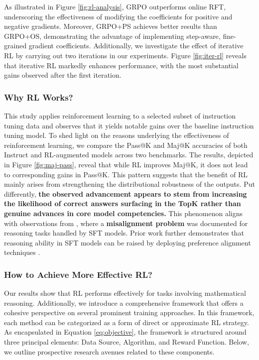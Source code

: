 \begin{itemize}[topsep=0pt]
\begin{itemize}[topsep=0pt]
As illustrated in Figure \ref{fig:rl-analysis}, GRPO outperforms online RFT, underscoring the effectiveness of modifying the coefficients for positive and negative gradients. Moreover, GRPO+PS achieves better results than GRPO+OS, demonstrating the advantage of implementing step-aware, fine-grained gradient coefficients. Additionally, we investigate the effect of iterative RL by carrying out two iterations in our experiments. Figure \ref{fig:iter-rl} reveals that iterative RL markedly enhances performance, with the most substantial gains observed after the first iteration.

\subsubsection{Why RL Works?} This study applies reinforcement learning to a selected subset of instruction tuning data and observes that it yields notable gains over the baseline instruction tuning model. To shed light on the reasons underlying the effectiveness of reinforcement learning, we compare the Pass@K and Maj@K accuracies of both Instruct and RL-augmented models across two benchmarks. The results, depicted in Figure \ref{fig:maj-pass}, reveal that while RL improves Maj@K, it does not lead to corresponding gains in Pass@K. This pattern suggests that the benefit of RL mainly arises from strengthening the distributional robustness of the outputs. Put differently, \textbf{the observed advancement appears to stem from increasing the likelihood of correct answers surfacing in the TopK rather than genuine advances in core model competencies.} This phenomenon aligns with observations from \citep{wang2023making}, where a \textbf{misalignment problem} was documented for reasoning tasks handled by SFT models. Prior work further demonstrates that reasoning ability in SFT models can be raised by deploying preference alignment techniques \citep{yuan2023rrhf,song2023preference,wang2023making}.

\subsubsection{How to Achieve More Effective RL?}
\label{sec:effec_rl}
Our results show that RL performs effectively for tasks involving mathematical reasoning. Additionally, we introduce a comprehensive framework that offers a cohesive perspective on several prominent training approaches. In this framework, each method can be categorized as a form of direct or approximate RL strategy. As encapsulated in Equation \ref{eq:objective}, the framework is structured around three principal elements: Data Source, Algorithm, and Reward Function. Below, we outline prospective research avenues related to these components.


\end{itemize}
\end{itemize}
